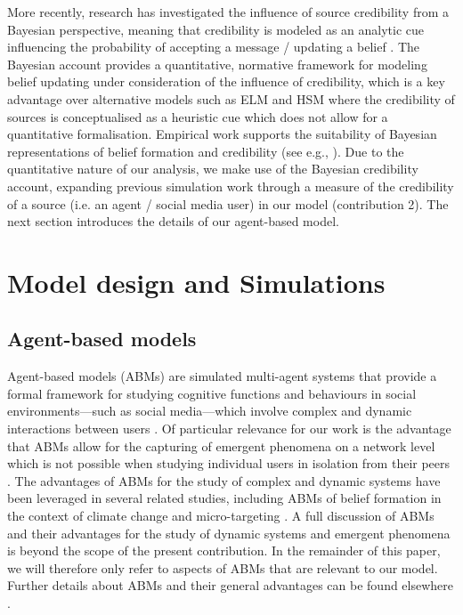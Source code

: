 \documentclass[fleqn,10pt]{wlscirep}
\begin{document}
More recently, research has investigated the influence of source credibility from a Bayesian perspective, meaning that credibility is modeled as an analytic cue influencing the probability of accepting a message / updating a belief \cite{bovens2003bayesian, hahn2009argument, harris2009bayesian, oaksford2007bayesian}. The Bayesian account provides a quantitative, normative framework for modeling belief updating under consideration of the influence of credibility, which is a key advantage over alternative models such as ELM and HSM where the credibility of sources is conceptualised as a heuristic cue which does not allow for a quantitative formalisation. Empirical work supports the suitability of Bayesian representations of belief formation and credibility (see e.g., \cite{harris2016appeal}). Due to the quantitative nature of our analysis, we make use of the Bayesian credibility account, expanding previous simulation work \cite{madsen2017growing, madsen2018large} through a measure of the credibility of a source (i.e. an agent / social media user) in our model (contribution 2). The next section introduces the details of our agent-based model.




\section*{Model design and Simulations}

\subsection*{Agent-based models}
Agent-based models (ABMs) are simulated multi-agent systems that provide a formal framework for studying cognitive functions and behaviours in social environments---such as social media---which involve complex and dynamic interactions between users \cite{wilensky2015introduction}. Of particular relevance for our work is the advantage that ABMs allow for the capturing of emergent phenomena on a network level which is not possible when studying individual users in isolation from their peers  \cite{madsen2019analytic}. The advantages of ABMs for the study of complex and dynamic systems have been leveraged in several related studies, including ABMs of belief formation in the context of climate change \cite{lewandowsky2019influence} and micro-targeting \cite{madsen2018method}. A full discussion of ABMs and their advantages for the study of dynamic systems and emergent phenomena is beyond the scope of the present contribution. In the remainder of this paper, we will therefore only refer to aspects of ABMs that are relevant to our model. Further details about ABMs and their general advantages can be found elsewhere \cite{macal2005tutorial, madsen2019analytic}.
\end{document}
